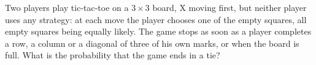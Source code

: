 Two players play tic-tac-toe on a $3\times3$ board, X moving first, but neither player uses any strategy: at each move the player chooses one of the empty squares, all empty squares being equally likely. The game stops as soon as a player completes a row, a column or a diagonal of three of his own marks, or when the board is full. What is the probability that the game ends in a tie?
